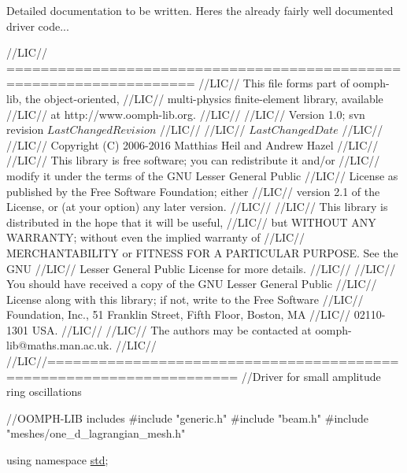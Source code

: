 Detailed documentation to be written. Here\textquotesingle{}s the already fairly well documented driver code...


\begin{DoxyCodeInclude}
\textcolor{comment}{//LIC// ====================================================================}
\textcolor{comment}{//LIC// This file forms part of oomph-lib, the object-oriented, }
\textcolor{comment}{//LIC// multi-physics finite-element library, available }
\textcolor{comment}{//LIC// at http://www.oomph-lib.org.}
\textcolor{comment}{//LIC// }
\textcolor{comment}{//LIC//    Version 1.0; svn revision $LastChangedRevision$}
\textcolor{comment}{//LIC//}
\textcolor{comment}{//LIC// $LastChangedDate$}
\textcolor{comment}{//LIC// }
\textcolor{comment}{//LIC// Copyright (C) 2006-2016 Matthias Heil and Andrew Hazel}
\textcolor{comment}{//LIC// }
\textcolor{comment}{//LIC// This library is free software; you can redistribute it and/or}
\textcolor{comment}{//LIC// modify it under the terms of the GNU Lesser General Public}
\textcolor{comment}{//LIC// License as published by the Free Software Foundation; either}
\textcolor{comment}{//LIC// version 2.1 of the License, or (at your option) any later version.}
\textcolor{comment}{//LIC// }
\textcolor{comment}{//LIC// This library is distributed in the hope that it will be useful,}
\textcolor{comment}{//LIC// but WITHOUT ANY WARRANTY; without even the implied warranty of}
\textcolor{comment}{//LIC// MERCHANTABILITY or FITNESS FOR A PARTICULAR PURPOSE.  See the GNU}
\textcolor{comment}{//LIC// Lesser General Public License for more details.}
\textcolor{comment}{//LIC// }
\textcolor{comment}{//LIC// You should have received a copy of the GNU Lesser General Public}
\textcolor{comment}{//LIC// License along with this library; if not, write to the Free Software}
\textcolor{comment}{//LIC// Foundation, Inc., 51 Franklin Street, Fifth Floor, Boston, MA}
\textcolor{comment}{//LIC// 02110-1301  USA.}
\textcolor{comment}{//LIC// }
\textcolor{comment}{//LIC// The authors may be contacted at oomph-lib@maths.man.ac.uk.}
\textcolor{comment}{//LIC// }
\textcolor{comment}{//LIC//====================================================================}
\textcolor{comment}{//Driver for small amplitude ring oscillations}

\textcolor{comment}{//OOMPH-LIB includes}
\textcolor{preprocessor}{#include "generic.h"}
\textcolor{preprocessor}{#include "beam.h"}
\textcolor{preprocessor}{#include "meshes/one\_d\_lagrangian\_mesh.h"}

\textcolor{keyword}{using namespace }\hyperlink{namespacestd}{std};


\end{DoxyCodeInclude}
